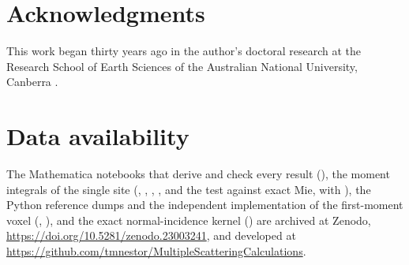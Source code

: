 \documentclass[extra,mreferee]{gji}
\begin{document}
\section*{Acknowledgments}
This work began thirty years ago in the author's doctoral research at the Research School of Earth
Sciences of the Australian National University, Canberra \citep{Nestor1996}.

\section*{Data availability}
\sloppy
The Mathematica notebooks that derive and check every result
(), the moment integrals of the single site
(, , ,
,  and the test against exact Mie,
 with
), the Python reference dumps
and the independent
implementation of the first-moment voxel (,
), and the exact normal-incidence kernel
()
are archived at Zenodo, \url{https://doi.org/10.5281/zenodo.23003241}, and developed at
\url{https://github.com/tmnestor/MultipleScatteringCalculations}.




\label{lastpage}
\end{document}
